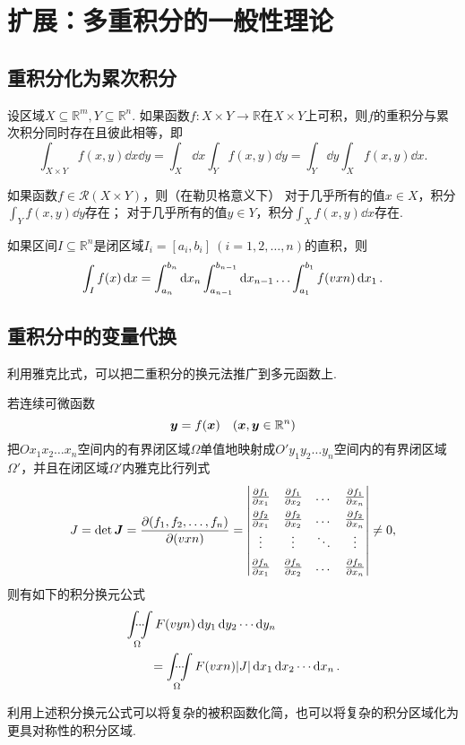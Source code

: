 \section{扩展：多重积分的一般性理论}
\subsection{重积分化为累次积分}
\begin{theorem}[富比尼定理]
设区域\(X\subseteq\mathbb{R}^m, Y\subseteq\mathbb{R}^n\).
如果函数\(f\colon X \times Y \to \mathbb{R}\)在\(X \times Y\)上可积，则\(f\)的重积分与累次积分同时存在且彼此相等，即\[
\int_{X \times Y} f(x,y) \dd{x}\dd{y}
= \int_X \dd{x} \int_Y f(x,y) \dd{y}
= \int_Y \dd{y} \int_X f(x,y) \dd{x}.
\]
\end{theorem}

\begin{corollary}
如果函数\(f\in\mathcal{R}(X \times Y)\)，则（在勒贝格意义下）%
对于几乎所有的值\(x \in X\)，积分\(\int_Y f(x,y) \dd{y}\)存在；%
对于几乎所有的值\(y \in Y\)，积分\(\int_X f(x,y) \dd{x}\)存在.
\end{corollary}

\begin{corollary}
\newcommand\intx[2][]{\int_{a_{#2}}^{b_{#2}} #1 \dd{x_{#2}}}%
如果区间\(I \subseteq \mathbb{R}^n\)是闭区域\(I_i = [a_i,b_i]\ (i=1,2,\dotsc,n)\)的直积，则\[
\int_I f(x) \dd{x}
= \intx{n} \intx{n-1} \dotso \intx[f(\v{x}{n})]{1}.
\]
\end{corollary}

\subsection{重积分中的变量代换}
利用雅克比式，可以把二重积分的换元法推广到多元函数上.
\begin{theorem}
若连续可微函数\[
\boldsymbol{y} = f(\boldsymbol{x})
\quad(\boldsymbol{x},\boldsymbol{y}\in\mathbb{R}^n)
\]把\(O x_1 x_2 \dotso x_n\)空间内的有界闭区域\(\Omega\)单值地映射成\(O' y_1 y_2 \dotso y_n\)空间内的有界闭区域\(\Omega'\)，并且在闭区域\(\Omega'\)内雅克比行列式\[
J = \det\mat{J}
= \jacobi{f_1,f_2,\dotsc,f_n}{\v{x}{n}}
= {
\def\arraystretch{1.5}
\begin{vmatrix}
\pdv{f_1}{x_1} & \pdv{f_1}{x_2} & \dots & \pdv{f_1}{x_n} \\
\pdv{f_2}{x_1} & \pdv{f_2}{x_2} & \dots & \pdv{f_2}{x_n} \\
\vdots & \vdots & \ddots & \vdots \\
\pdv{f_n}{x_1} & \pdv{f_n}{x_2} & \dots & \pdv{f_n}{x_n} \\
\end{vmatrix}
}
\neq 0,
\]则有如下的积分换元公式\begin{equation}
\begin{split}
&\idotsint\limits_{\Omega} F(v{y}{n}) \dd{y_1}\dd{y_2}\dotsm\dd{y_n} \\
&\hspace{20pt}= \idotsint\limits_{\Omega} F(v{x}{n}) \abs{J} \dd{x_1}\dd{x_2}\dotsm\dd{x_n}.
\end{split}
\end{equation}
\end{theorem}
利用上述积分换元公式可以将复杂的被积函数化简，也可以将复杂的积分区域化为更具对称性的积分区域.


